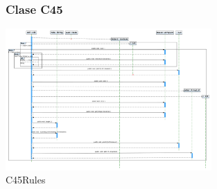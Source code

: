 % 
% 

\begin{figure}
\subsubsection{Clase C45}
\centering
\includegraphics[angle=90, width=0.7\textwidth]{imgsSecuencia/c45/C45Rules.png}
\caption{C45Rules}
\end{figure}
\newpage



